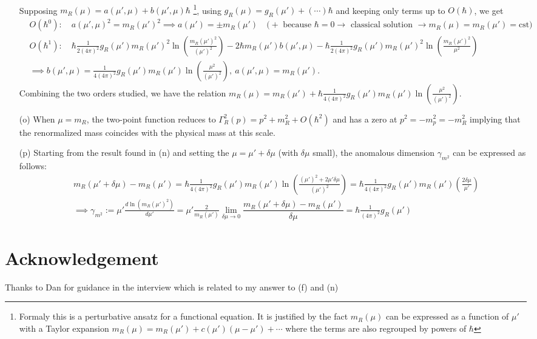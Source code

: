 \documentclass[10pt, a4paper]{article}
\begin{document}
\begin{enumerate}
\begin{align*}
  \end{align*}
  Supposing $m_R(\mu) = a(\mu', \mu) +  b(\mu', \mu)\hbar$ \footnote{Formaly this is a perturbative ansatz for a functional equation. It is justified by the fact $m_R(\mu)$ can be expressed as a function of $\mu'$ with a Taylor expansion $m_R(\mu) = m_R(\mu') + c(\mu')(\mu - \mu') + \cdots$ where the terms are also regrouped by powers of $\hbar$}, using $g_R(\mu) = g_R(\mu') + (\cdots)\hbar$ and keeping only terms up to $O(\hbar)$, we get 
  \begin{align*}
    &O(\hbar^0): \quad a(\mu', \mu)^2 = m_R(\mu')^2 \implies a(\mu') = \pm m_R(\mu') \quad \text{($+$ because $\hbar=0 \to$ classical solution $\to m_R(\mu) = m_R(\mu') = \text{cst}$)}\\
    &O(\hbar^1): \quad \hbar \frac{1}{2(4\pi)^2} g_R(\mu') m_R(\mu')^2 \ln\left(\frac{ m_R(\mu')^2}{(\mu')^2}\right) - 2\hbar m_R(\mu') b(\mu', \mu) - \hbar \frac{1}{2(4\pi)^2} g_R(\mu') m_R(\mu')^2 \ln\left(\frac{ m_R(\mu')^2}{\mu^2}\right)\\
    &\implies b(\mu', \mu) = \frac{1}{4(4\pi)^2} g_R(\mu') m_R(\mu') \ln\left(\frac{\mu^2}{(\mu')^2}\right),\ a(\mu', \mu) = m_R(\mu').  
  \end{align*}
  Combining the two orders studied, we have the relation $m_R(\mu) = m_R(\mu') + \hbar \frac{1}{4(4\pi)^2} g_R(\mu') m_R(\mu') \ln\left(\frac{\mu^2}{(\mu')^2}\right)$.
  \item[(o)] When $\mu = m_R$, the two-point function reduces to $\Gamma^{2}_R(p) = p^2 + m_R^2 + O(\hbar^2)$ and has a zero at $p^2 = -m_p^2 = -m_R^2$ implying that the renormalized mass coincides with the physical mass at this scale. 
  \item[(p)] Starting from the result found in (n) and setting the $\mu = \mu' +\delta \mu$ (with $\delta \mu$ small), the anomalous dimension $\gamma_{m^2}$ can be expressed as follows:
  \begin{align*}
    &m_R(\mu'+\delta \mu) - m_R(\mu') = \hbar \frac{1}{4(4\pi)^2} g_R(\mu') m_R(\mu') \ln\left(\frac{(\mu')^2 + 2 \mu' \delta \mu}{(\mu')^2}\right) = \hbar \frac{1}{4(4\pi)^2} g_R(\mu') m_R(\mu') \left(\frac{2\delta \mu}{\mu'}\right)\\
    &\implies \gamma_{m^2} := \mu' \frac{d \ln(m_R(\mu')^2)}{d \mu'}= \mu' \frac{2}{m_R(\mu')}\lim_{\delta\mu \to 0} \dfrac{m_R(\mu'+\delta \mu) - m_R(\mu')}{\delta \mu} = \hbar \frac{1}{(4\pi)^2} g_R(\mu')
  \end{align*}
\end{enumerate}


\section{Acknowledgement}

Thanks to Dan for guidance in the interview which is related to my answer to (f) and (n)




\makereferences


\end{document}
